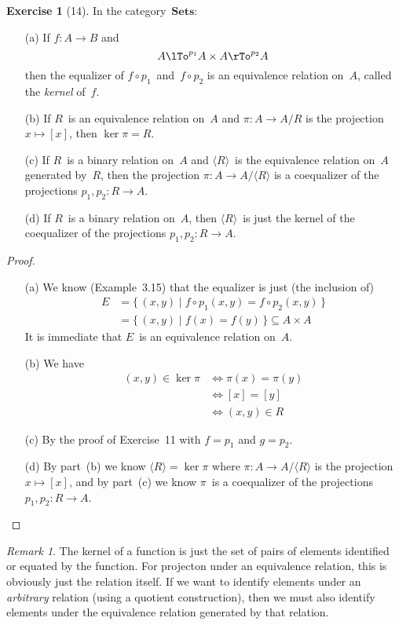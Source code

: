\documentclass[letterpaper,12pt]{article}
\newcommand{\after}{\circ}
\newcommand{\cat}[1]{\mathbf{#1}}
\newcommand{\gen}[1]{\langle{#1}\rangle}
\newcommand{\Sets}{\cat{Sets}}
\theoremstyle{definition}
\newtheorem*{exer}{Exercise}
\theoremstyle{remark}
\newtheorem*{rmk}{Remark}
\theoremstyle{direction}
\begin{document}
\begin{exer}[14]
In the category~\(\Sets\):
\begin{enumerate}[itemsep=0pt]
\item[(a)] If \(f:A\to B\) and
\[A\lTo^{p_1}A\times A\rTo^{p_2}A\]
then the equalizer of \(f\after p_1\)~and~\(f\after p_2\) is an equivalence relation on~\(A\), called the \emph{kernel} of~\(f\).
\item[(b)] If \(R\)~is an equivalence relation on~\(A\) and \(\pi:A\to A/R\) is the projection \(x\mapsto[x]\), then \(\ker\pi=R\).
\item[(c)] If \(R\)~is a binary relation on~\(A\) and \(\gen{R}\)~is the equivalence relation on~\(A\) generated by~\(R\), then the projection \(\pi:A\to A/\gen{R}\) is a coequalizer of the projections \(p_1,p_2:R\to A\).
\item[(d)] If \(R\)~is a binary relation on~\(A\), then \(\gen{R}\)~is just the kernel of the coequalizer of the projections \(p_1,p_2:R\to A\).
\end{enumerate}
\end{exer}
\begin{proof}\
\begin{enumerate}[itemsep=0pt]
\item[(a)] We know (Example~3.15) that the equalizer is just (the inclusion of)
\begin{align*}
E&=\{\,(x,y)\mid f\after p_1(x,y)=f\after p_2(x,y)\,\}\\
	&=\{\,(x,y)\mid f(x)=f(y)\,\}\subseteq A\times A
\end{align*}
It is immediate that \(E\)~is an equivalence relation on~\(A\).
\item[(b)] We have
\begin{align*}
(x,y)\in\ker\pi&\iff\pi(x)=\pi(y)\\
	&\iff[x]=[y]\\
	&\iff(x,y)\in R
\end{align*}
\item[(c)] By the proof of Exercise~11 with \(f=p_1\) and \(g=p_2\).
\item[(d)] By part~(b) we know \(\gen{R}=\ker\pi\) where \(\pi:A\to A/\gen{R}\) is the projection \(x\mapsto[x]\), and by part~(c) we know \(\pi\)~is a coequalizer of the projections \(p_1,p_2:R\to A\).\qedhere
\end{enumerate}
\end{proof}
\begin{rmk}
The kernel of a function is just the set of pairs of elements identified or equated by the function. For projecton under an equivalence relation, this is obviously just the relation itself. If we want to identify elements under an \emph{arbitrary} relation (using a quotient construction), then we must also identify elements under the equivalence relation generated by that relation.
\end{rmk}
\end{document}

